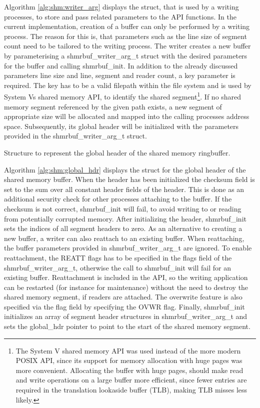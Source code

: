 Algorithm \ref{alg:shm:writer_arg} displays the struct, that is used by a writing processes, to store and pass related parameters to the API functions.
In the current implementation, creation of a buffer can only be performed by a writing process. The reason for this is, that parameters such as the line
size of segment count need to be tailored to the writing process. The writer creates a new buffer by parameterising a shmrbuf\_writer\_arg\_t struct with
the desired parameters for the buffer and calling shmrbuf\_init. In addition to the already discussed parameters line size and line, segment and reader count, 
a key parameter is required. The key has to be a valid filepath within the file system and is used by System Vs shared memory API, to identify the shared segment\footnote{The System V shared memory API \cite{systemvshm} was used instead of the more modern POSIX API, since its support for memory allocation with huge pages was more convenient. Allocating the buffer with huge pages, should make read and write operations on a large buffer more efficient, since fewer entries are required in the translation lookaside buffer (TLB), making TLB misses less likely.}.  
If no shared memory segment referenced by the given path exists, a new segment of appropriate size will be allocated and mapped into the calling processes address space. Subsequently, its global header will 
be initialized with the parameters provided in the shmrbuf\_writer\_arg\_t struct.  

\begin{algorithm}[h!]
    
    \label{alg:shm:global_hdr}
    \caption[Shared Memory Ringbuffer: Global Header]{Structure to represent the global header of the shared memory ringbuffer.}
\end{algorithm}

Algorithm \ref{alg:shm:global_hdr} displays the struct for the global header of the shared memory buffer. When the header has been initialized
the checksum field is set to the sum over all constant header fields of the header. This is done as an additional security check for other processes attaching to the buffer. 
If the checksum is not correct, shmrbuf\_init will fail, to avoid writing to or reading from potentially corrupted memory. After initializing the header,
shmrbuf\_init sets the indices of all segment headers to zero. As an alternative to creating a new buffer,
a writer can also reattach to an existing buffer. When reattaching, the buffer parameters provided in shmrbuf\_writer\_arg\_t are ignored. To enable reattachment, the REATT flags has to be specified in the flags field of the shmrbuf\_writer\_arg\_t, otherwise the call   
to shmrbuf\_init will fail for an existing buffer. Reattachment is included in the API, so the writing application can be restarted (for instance for maintenance) without the need to
destroy the shared memory segment, if readers are attached. The overwrite feature is also specified via the flag field by specifying the OVWR flag.
Finally, shmrbuf\_init initializes an array of segment header structures in shmrbuf\_writer\_arg\_t and sets the global\_hdr pointer to point to the start of the shared memory segment.

